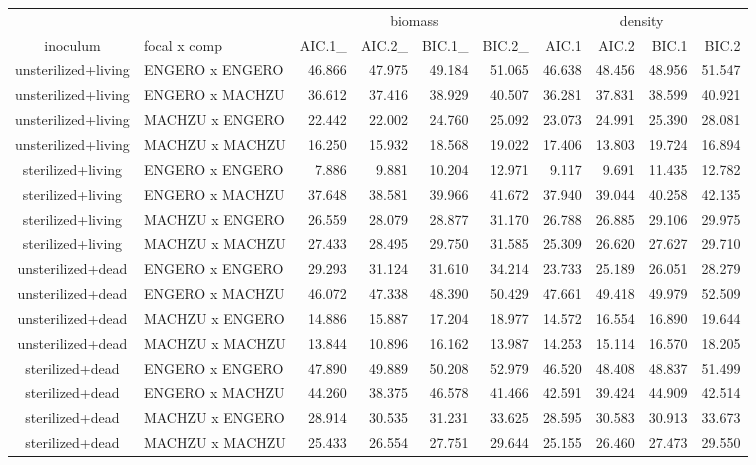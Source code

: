 \begin{table}[t]
\fontsize{12.0pt}{14.4pt}\selectfont
\begin{tabular*}{\linewidth}{@{\extracolsep{\fill}}clrrrrrrrr}
\toprule
 &  & \multicolumn{4}{c}{biomass} & \multicolumn{4}{c}{density} \\ 
\cmidrule(lr){3-6} \cmidrule(lr){7-10}
inoculum & focal x comp & AIC.1\_ & AIC.2\_ & BIC.1\_ & BIC.2\_ & AIC.1 & AIC.2 & BIC.1 & BIC.2 \\ 
\midrule\addlinespace[2.5pt]
unsterilized+living & ENGERO x ENGERO & 46.866 & 47.975 & 49.184 & 51.065 & 46.638 & 48.456 & 48.956 & 51.547 \\ 
unsterilized+living & ENGERO x MACHZU & 36.612 & 37.416 & 38.929 & 40.507 & 36.281 & 37.831 & 38.599 & 40.921 \\ 
unsterilized+living & MACHZU x ENGERO & 22.442 & 22.002 & 24.760 & 25.092 & 23.073 & 24.991 & 25.390 & 28.081 \\ 
unsterilized+living & MACHZU x MACHZU & 16.250 & 15.932 & 18.568 & 19.022 & 17.406 & 13.803 & 19.724 & 16.894 \\ 
sterilized+living & ENGERO x ENGERO & 7.886 & 9.881 & 10.204 & 12.971 & 9.117 & 9.691 & 11.435 & 12.782 \\ 
sterilized+living & ENGERO x MACHZU & 37.648 & 38.581 & 39.966 & 41.672 & 37.940 & 39.044 & 40.258 & 42.135 \\ 
sterilized+living & MACHZU x ENGERO & 26.559 & 28.079 & 28.877 & 31.170 & 26.788 & 26.885 & 29.106 & 29.975 \\ 
sterilized+living & MACHZU x MACHZU & 27.433 & 28.495 & 29.750 & 31.585 & 25.309 & 26.620 & 27.627 & 29.710 \\ 
unsterilized+dead & ENGERO x ENGERO & 29.293 & 31.124 & 31.610 & 34.214 & 23.733 & 25.189 & 26.051 & 28.279 \\ 
unsterilized+dead & ENGERO x MACHZU & 46.072 & 47.338 & 48.390 & 50.429 & 47.661 & 49.418 & 49.979 & 52.509 \\ 
unsterilized+dead & MACHZU x ENGERO & 14.886 & 15.887 & 17.204 & 18.977 & 14.572 & 16.554 & 16.890 & 19.644 \\ 
unsterilized+dead & MACHZU x MACHZU & 13.844 & 10.896 & 16.162 & 13.987 & 14.253 & 15.114 & 16.570 & 18.205 \\ 
sterilized+dead & ENGERO x ENGERO & 47.890 & 49.889 & 50.208 & 52.979 & 46.520 & 48.408 & 48.837 & 51.499 \\ 
sterilized+dead & ENGERO x MACHZU & 44.260 & 38.375 & 46.578 & 41.466 & 42.591 & 39.424 & 44.909 & 42.514 \\ 
sterilized+dead & MACHZU x ENGERO & 28.914 & 30.535 & 31.231 & 33.625 & 28.595 & 30.583 & 30.913 & 33.673 \\ 
sterilized+dead & MACHZU x MACHZU & 25.433 & 26.554 & 27.751 & 29.644 & 25.155 & 26.460 & 27.473 & 29.550 \\ 
\bottomrule
\end{tabular*}
\end{table}

